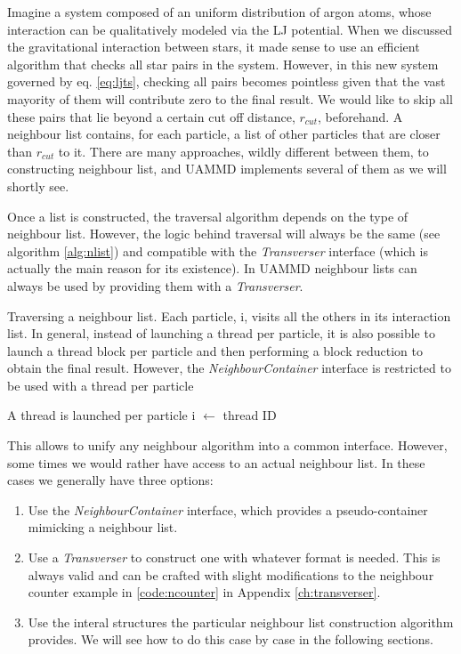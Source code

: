 \documentclass[ twoside,openright,titlepage,numbers=noenddot,%
headinclude,footinclude,cleardoublepage=empty,abstract=on,
BCOR=5mm,paper=a4,fontsize=11pt, dvipsnames
]{scrreprt}
\newcommand{\uammd}{\gls{UAMMD}\xspace}
\begin{document}
Imagine a system composed of an uniform distribution of argon atoms, whose interaction can be qualitatively modeled via the \gls{LJ} potential. When we discussed the gravitational interaction between stars, it made sense to use an efficient algorithm that checks all star pairs in the system. However, in this new system governed by eq. \eqref{eq:ljts}, checking all pairs becomes pointless given that the vast mayority of them will contribute zero to the final result. We would like to skip all these pairs that lie beyond a certain cut off distance, $r_{cut}$, beforehand. A neighbour list contains, for each particle, a list of other particles that are closer than $r_{cut}$ to it. There are many approaches, wildly different between them, to constructing neighbour list, and \uammd implements several of them as we will shortly see.

Once a list is constructed, the traversal algorithm depends on the type of neighbour list. However, the logic behind traversal will always be the same (see algorithm \ref{alg:nlist}) and compatible with the \emph{Transverser} interface (which is actually the main reason for its existence). In \uammd neighbour lists can always be used by providing them with a \emph{Transverser}.

\begin{algorithm}
  \caption{Traversing a neighbour list. Each particle, i, visits all the others in its interaction list.
    In general, instead of launching a thread per particle, it is also possible to launch a thread block per particle and then performing a block reduction to obtain the final result. However, the \emph{NeighbourContainer} interface is restricted to be used with a thread per particle}\label{alg:nlist}
  \begin{algorithmic}[1]
    \Require A thread is launched per particle
    \State i $\gets$ thread ID 
    \EndFor
  \end{algorithmic}
\end{algorithm}

This allows to unify any neighbour algorithm into a common interface. However, some times we would rather have access to an actual neighbour list. In these cases we generally have three options:
\begin{enumerate}
\item Use the \emph{NeighbourContainer} interface, which provides a pseudo-container mimicking a neighbour list.
\item Use a \emph{Transverser} to construct one with whatever format is needed.
  This is always valid and can be crafted with slight modifications to the neighbour counter example in \ref{code:ncounter} in Appendix \ref{ch:transverser}.
\item Use the interal structures the particular neighbour list construction algorithm provides.
  We will see how to do this case by case in the following sections.
\end{enumerate}
\end{document}
